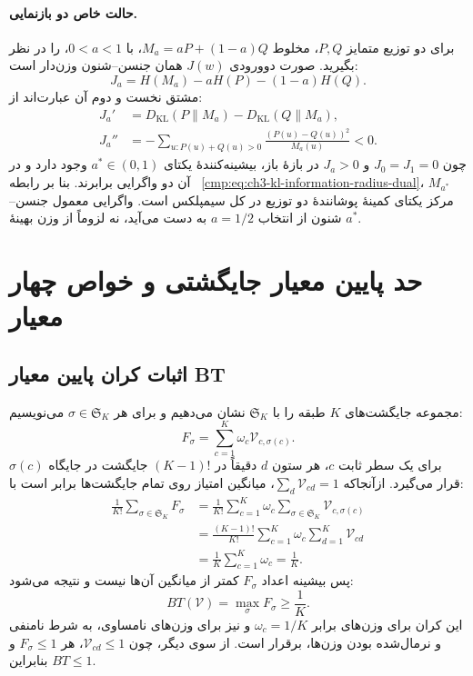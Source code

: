 \paragraph{حالت خاص دو بازنمایی.}
برای دو توزیع متمایز $P,Q$، مخلوط
$M_a=aP+(1-a)Q$، با $0<a<1$، را در نظر بگیرید.
صورت دوورودی $J(w)$ همان جنسن--شنون وزن‌دار است:
\[
J_a=H(M_a)-aH(P)-(1-a)H(Q).
\]
مشتق نخست و دوم آن عبارت‌اند از:
\[
\begin{aligned}
J_a'&=D_{\mathrm{KL}}(P\|M_a)-D_{\mathrm{KL}}(Q\|M_a),\\
J_a''&=-\sum_{u:P(u)+Q(u)>0}
\frac{(P(u)-Q(u))^2}{M_a(u)}<0.
\end{aligned}
\]
چون $J_0=J_1=0$ و $J_a>0$ در بازهٔ باز،
بیشینه‌کنندهٔ یکتای $a^*\in(0,1)$ وجود دارد و
در آن دو واگرایی برابرند. بنا بر رابطه~
\eqref{cmp:eq:ch3-kl-information-radius-dual}،
$M_{a^*}$ مرکز یکتای کمینهٔ پوشانندهٔ دو توزیع
در کل سیمپلکس است. واگرایی معمول جنسن--شنون
از انتخاب $a=1/2$ به دست می‌آید، نه لزوماً از
وزن بهینهٔ $a^*$.

\section{حد پایین معیار جایگشتی و خواص چهار معیار}
\label{app:ch3-assignment-comparisons}

\subsection{اثبات کران پایین معیار BT}
\label{app:ch3-BT-bound-proof}
مجموعه جایگشت‌های $K$ طبقه را با $\mathfrak{S}_K$ نشان می‌دهیم و برای هر $\sigma\in \mathfrak{S}_K$ می‌نویسیم:
\begin{equation}\label{eq:app-ch3-BT-score}
F_\sigma=\sum_{c=1}^{K}\omega_c\mathcal V_{c,\sigma(c)}.
\end{equation}
برای یک سطر ثابت $c$، هر ستون $d$ دقیقاً در $(K-1)!$ جایگشت در جایگاه $\sigma(c)$ قرار می‌گیرد. ازآنجاکه $\sum_d\mathcal V_{cd}=1$، میانگین امتیاز روی تمام جایگشت‌ها برابر است با:
\begin{equation}\label{eq:app-ch3-BT-average}
\begin{aligned}
\frac{1}{K!}\sum_{\sigma\in \mathfrak{S}_K}F_\sigma
&=\frac{1}{K!}\sum_{c=1}^{K}\omega_c
\sum_{\sigma\in \mathfrak{S}_K}\mathcal V_{c,\sigma(c)}\\
&=\frac{(K-1)!}{K!}\sum_{c=1}^{K}\omega_c
\sum_{d=1}^{K}\mathcal V_{cd}\\
&=\frac{1}{K}\sum_{c=1}^{K}\omega_c=\frac{1}{K}.
\end{aligned}
\end{equation}
پس بیشینه اعداد $F_\sigma$ کمتر از میانگین آن‌ها نیست و نتیجه می‌شود:
\begin{equation}\label{eq:app-ch3-BT-lower}
BT(\mathcal V)=\max_{\sigma}F_\sigma\ge\frac1K.
\end{equation}
این کران برای وزن‌های برابر $\omega_c=1/K$ و نیز برای وزن‌های نامساوی، به شرط نامنفی و نرمال‌شده بودن وزن‌ها، برقرار است. از سوی دیگر، چون $\mathcal V_{cd}\le1$، هر $F_\sigma\le1$ و بنابراین $BT\le1$.


